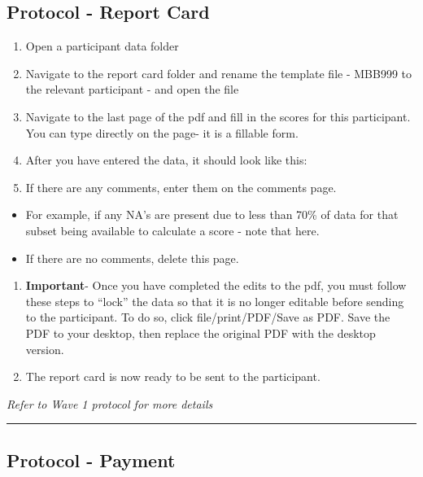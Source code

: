 \documentclass[]{book}
\begin{document}
\hypertarget{protocol---report-card-2}{%
\subsection{Protocol - Report Card}\label{protocol---report-card-2}}

\begin{enumerate}
\def\labelenumi{\arabic{enumi}.}
\item
  Open a participant data folder
\item
  Navigate to the report card folder and rename the template file - MBB999 to the relevant participant - and open the file
\item
  Navigate to the last page of the pdf and fill in the scores for this participant. You can type directly on the page- it is a fillable form.
\item
  After you have entered the data, it should look like this:
\item
  If there are any comments, enter them on the comments page.
\end{enumerate}

\begin{itemize}
\item
  For example, if any NA's are present due to less than 70\% of data for that subset being available to calculate a score - note that here.
\item
  If there are no comments, delete this page.
\end{itemize}

\begin{enumerate}
\def\labelenumi{\arabic{enumi}.}
\setcounter{enumi}{5}
\item
  \textbf{Important}- Once you have completed the edits to the pdf, you must follow these steps to ``lock'' the data so that it is no longer editable before sending to the participant. To do so, click file/print/PDF/Save as PDF. Save the PDF to your desktop, then replace the original PDF with the desktop version.
\item
  The report card is now ready to be sent to the participant.
\end{enumerate}

\emph{Refer to Wave 1 protocol for more details}

\begin{center}\rule{0.5\linewidth}{0.5pt}\end{center}

\hypertarget{protocol---payment-6}{%
\subsection{Protocol - Payment}\label{protocol---payment-6}}
\end{document}
